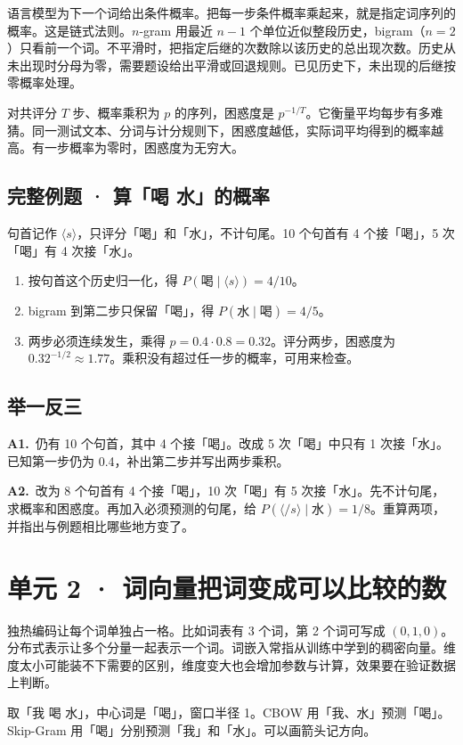 \documentclass[UTF8,a4paper,11pt]{ctexart}
\newcommand{\CompactQuestion}[2]{\par\noindent\textbf{#1.}\ #2\par\vspace{.8em}}
\begin{document}
语言模型为下一个词给出条件概率。把每一步条件概率乘起来，就是指定词序列的概率。这是链式法则。$n$-gram 用最近 $n-1$ 个单位近似整段历史，bigram（$n=2$）只看前一个词。不平滑时，把指定后继的次数除以该历史的总出现次数。历史从未出现时分母为零，需要题设给出平滑或回退规则。已见历史下，未出现的后继按零概率处理。

对共评分 $T$ 步、概率乘积为 $p$ 的序列，困惑度是 $p^{-1/T}$。它衡量平均每步有多难猜。同一测试文本、分词与计分规则下，困惑度越低，实际词平均得到的概率越高。有一步概率为零时，困惑度为无穷大。

\subsection{完整例题 · 算「喝 水」的概率}
句首记作 $\langle s\rangle$，只评分「喝」和「水」，不计句尾。10 个句首有 4 个接「喝」，5 次「喝」有 4 次接「水」。

\begin{enumerate}
\item 按句首这个历史归一化，得 $P(\text{喝}\mid\langle s\rangle)=4/10$。
\item bigram 到第二步只保留「喝」，得 $P(\text{水}\mid\text{喝})=4/5$。
\item 两步必须连续发生，乘得 $p=0.4\cdot0.8=0.32$。评分两步，困惑度为 $0.32^{-1/2}\approx1.77$。乘积没有超过任一步的概率，可用来检查。
\end{enumerate}
\subsection{举一反三}
\CompactQuestion{A1}{仍有 10 个句首，其中 4 个接「喝」。改成 5 次「喝」中只有 1 次接「水」。已知第一步仍为 0.4，补出第二步并写出两步乘积。}
\CompactQuestion{A2}{改为 8 个句首有 4 个接「喝」，10 次「喝」有 5 次接「水」。先不计句尾，求概率和困惑度。再加入必须预测的句尾，给 $P(\langle /s\rangle\mid\text{水})=1/8$。重算两项，并指出与例题相比哪些地方变了。}
\clearpage
\section{单元 2 · 词向量把词变成可以比较的数}
独热编码让每个词单独占一格。比如词表有 3 个词，第 2 个词可写成 $(0,1,0)$。分布式表示让多个分量一起表示一个词。词嵌入常指从训练中学到的稠密向量。维度太小可能装不下需要的区别，维度变大也会增加参数与计算，效果要在验证数据上判断。

取「我 喝 水」，中心词是「喝」，窗口半径 1。CBOW 用「我、水」预测「喝」。Skip-Gram 用「喝」分别预测「我」和「水」。可以画箭头记方向。
\end{document}
